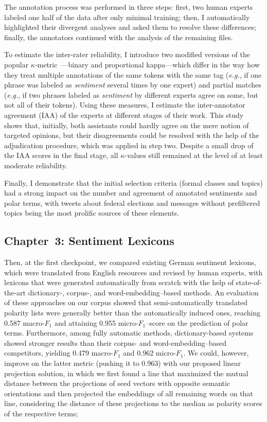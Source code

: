 \documentclass[11pt]{article}
\newcommand{\eg}{\textit{e.g.},}
\newcommand{\F}[0]{$F_1$}
\renewcommand{\cite}{\citep}
\begin{document}
The annotation process was performed in three steps: first, two human
experts labeled one half of the data after only minimal training;
then, I automatically highlighted their divergent analyses and asked
them to resolve these differences; finally, the annotators continued
with the analysis of the remaining files.

To estimate the inter-rater reliability, I introduce two modified
versions of the popular $\kappa$-metric~\cite{Cohen:60}---binary and
proportional kappa---which differ in the way how they treat multiple
annotations of the same tokens with the same tag (\eg{} if one phrase
was labeled as \emph{sentiment} several times by one expert) and
partial matches (\eg{} if two phrases labeled as \emph{sentiment} by
different experts agree on some, but not all of their tokens).  Using
these measures, I estimate the inter-annotator agreement (IAA) of the
experts at different stages of their work.  This study shows that,
initially, both assistants could hardly agree on the mere notion of
targeted opinions, but their disagreements could be resolved with the
help of the adjudication procedure, which was applied in step two.
Despite a small drop of the IAA scores in the final stage, all
$\kappa$-values still remained at the level of at least moderate
reliability.

Finally, I demonstrate that the initial selection criteria (formal
classes and topics) had a strong impact on the number and agreement of
annotated sentiments and polar terms, with tweets about federal
elections and messages without prefiltered topics being the most
prolific sources of these elements.

\subsection{Chapter~3: Sentiment Lexicons}

Then, at the first checkpoint, we compared existing German sentiment
lexicons, which were translated from English resources and revised by
human experts, with lexicons that were generated automatically from
scratch with the help of state-of-the-art dictionary\mbox{-,}
corpus\mbox{-,} and word-embedding--based methods.  An evaluation of
these approaches on our corpus showed that semi-automatically
translated polarity lists were generally better than the automatically
induced ones, reaching 0.587 macro-\F{} and attaining 0.955
micro-\F{}--score on the prediction of polar terms.  Furthermore,
among fully automatic methods, dictionary-based systems showed
stronger results than their corpus- and word-embedding--based
competitors, yielding 0.479 macro-\F{} and 0.962 micro-\F{}.  We
could, however, improve on the latter metric (pushing it to 0.963)
with our proposed linear projection solution, in which we first found
a line that maximized the mutual distance between the projections of
seed vectors with opposite semantic orientations and then projected
the embeddings of all remaining words on that line, considering the
distance of these projections to the median as polarity scores of the
respective terms;
\end{document}
